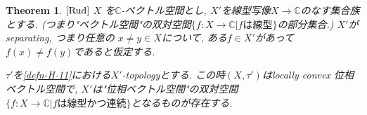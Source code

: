 \documentclass[dvipdfmx,a4paper,11pt]{article} %
\newtheorem{thm}{Theorem}[section]
\theoremstyle{definition}
\theoremstyle{remark}
\numberwithin{equation}{section}
\newcommand{\C}{\mathbb{C}}
\begin{document}
\begin{tcolorbox}[mybox]
\begin{thm}{$\cite[Thm 3.10]{Rud}$}
\label{thm-H-12}
\(X\) を\(\mathbb{C}\)-ベクトル空間とし, 
\(X'\)を線型写像$X \to \C$のなす集合族とする. 
(つまり"ベクトル空間"の双対空間$\{f : X \to \C | \text{$f$は線型}\}$の部分集合.)
$X'$がseparating, つまり任意の \( x \neq y \in X\)について, ある\(f \in X'\)があって\(f(x) \neq f(y)\)であると仮定する. 

\(\tau'\)を\ref{defn-H-11}における$X'$-topologyとする. 
この時\((X, \tau')\)はlocally convex 位相ベクトル空間で, 
$X'$は"位相ベクトル空間"の双対空間$\{f : X \to \C | \text{$f$は線型かつ連続}\}$となるものが存在する. 
\end{thm}
\end{tcolorbox}
\end{document}
